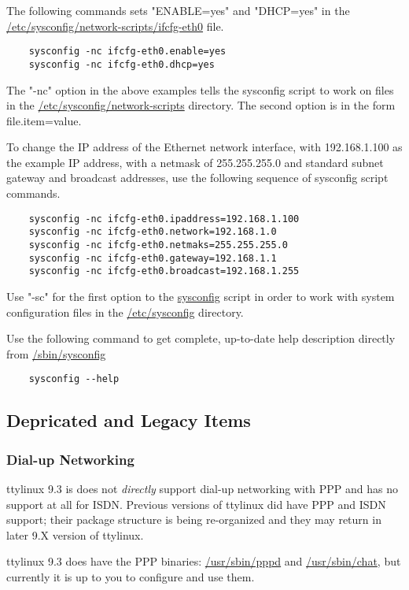 \documentclass[10pt]{article}
\begin{document}
The following commands sets "ENABLE=yes" and "DHCP=yes" in the
\url{/etc/sysconfig/network-scripts/ifcfg-eth0} file.

\begin{lstlisting}
	sysconfig -nc ifcfg-eth0.enable=yes
	sysconfig -nc ifcfg-eth0.dhcp=yes
\end{lstlisting}

The "-nc" option in the above examples tells the sysconfig script to work on
files in the \url{/etc/sysconfig/network-scripts} directory. The second option
is in the form file.item=value.

To change the IP address of the Ethernet network interface, with 192.168.1.100
as the example IP address, with a netmask of 255.255.255.0 and standard subnet
gateway and broadcast addresses, use the following sequence of sysconfig script
commands.

\begin{lstlisting}
	sysconfig -nc ifcfg-eth0.ipaddress=192.168.1.100
	sysconfig -nc ifcfg-eth0.network=192.168.1.0
	sysconfig -nc ifcfg-eth0.netmaks=255.255.255.0
	sysconfig -nc ifcfg-eth0.gateway=192.168.1.1
	sysconfig -nc ifcfg-eth0.broadcast=192.168.1.255
\end{lstlisting}

Use "-sc" for the first option to the \url{sysconfig} script in order to work
with system configuration files in the \url{/etc/sysconfig} directory.

Use the following command to get complete, up-to-date help description directly
from \url{/sbin/sysconfig}
\begin{lstlisting}
	sysconfig --help
\end{lstlisting}

\subsection{Depricated and Legacy Items}

\subsubsection{Dial-up Networking}

ttylinux 9.3 is does not {\it directly} support dial-up networking with PPP and
has no support at all for ISDN. Previous versions of ttylinux did have PPP and
ISDN support; their package structure is being re-organized and they may return
in later 9.X version of ttylinux.

ttylinux 9.3 does have the PPP binaries: \url{/usr/sbin/pppd} and
\url{/usr/sbin/chat}, but currently it is up to you to configure and use them.
\end{document}

